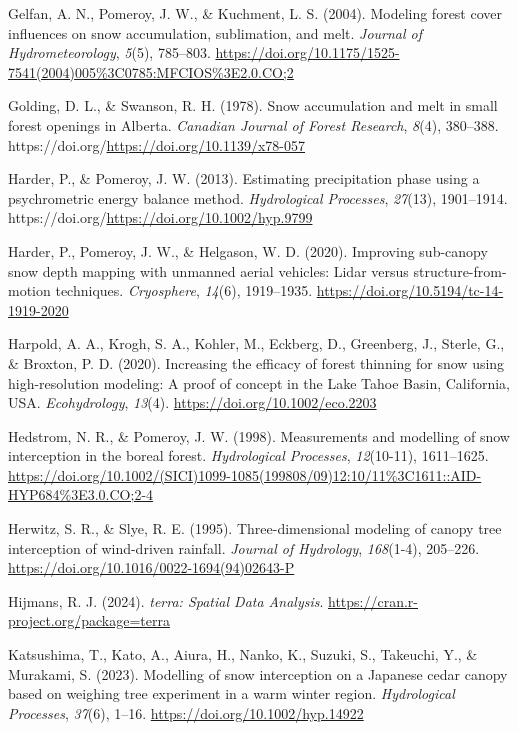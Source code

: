\documentclass[
  letterpaper,
  DIV=11,
  numbers=noendperiod]{scrartcl}
\newlength{\cslhangindent}
\newenvironment{CSLReferences}[2] %
 {\begin{list}{}{%
  \setlength{\itemindent}{0pt}
  \setlength{\leftmargin}{0pt}
  \setlength{\parsep}{0pt}
  \ifodd #1
   \setlength{\leftmargin}{\cslhangindent}
   \setlength{\itemindent}{-1\cslhangindent}
  \fi
  \setlength{\itemsep}{#2\baselineskip}}}
 {\end{list}}
\begin{document}
\begin{CSLReferences}{1}{0}
Gelfan, A. N., Pomeroy, J. W., \& Kuchment, L. S. (2004). {Modeling
forest cover influences on snow accumulation, sublimation, and melt}.
\emph{Journal of Hydrometeorology}, \emph{5}(5), 785--803.
\url{https://doi.org/10.1175/1525-7541(2004)005\%3C0785:MFCIOS\%3E2.0.CO;2}

Golding, D. L., \& Swanson, R. H. (1978). {Snow accumulation and melt in
small forest openings in Alberta}. \emph{Canadian Journal of Forest
Research}, \emph{8}(4), 380--388.
https://doi.org/\url{https://doi.org/10.1139/x78-057}

Harder, P., \& Pomeroy, J. W. (2013). {Estimating precipitation phase
using a psychrometric energy balance method}. \emph{Hydrological
Processes}, \emph{27}(13), 1901--1914.
https://doi.org/\url{https://doi.org/10.1002/hyp.9799}

Harder, P., Pomeroy, J. W., \& Helgason, W. D. (2020). {Improving
sub-canopy snow depth mapping with unmanned aerial vehicles: Lidar
versus structure-from-motion techniques}. \emph{Cryosphere},
\emph{14}(6), 1919--1935. \url{https://doi.org/10.5194/tc-14-1919-2020}

Harpold, A. A., Krogh, S. A., Kohler, M., Eckberg, D., Greenberg, J.,
Sterle, G., \& Broxton, P. D. (2020). {Increasing the efficacy of forest
thinning for snow using high-resolution modeling: A proof of concept in
the Lake Tahoe Basin, California, USA}. \emph{Ecohydrology},
\emph{13}(4). \url{https://doi.org/10.1002/eco.2203}

Hedstrom, N. R., \& Pomeroy, J. W. (1998). {Measurements and modelling
of snow interception in the boreal forest}. \emph{Hydrological
Processes}, \emph{12}(10-11), 1611--1625.
\url{https://doi.org/10.1002/(SICI)1099-1085(199808/09)12:10/11\%3C1611::AID-HYP684\%3E3.0.CO;2-4}

Herwitz, S. R., \& Slye, R. E. (1995). {Three-dimensional modeling of
canopy tree interception of wind-driven rainfall}. \emph{Journal of
Hydrology}, \emph{168}(1-4), 205--226.
\url{https://doi.org/10.1016/0022-1694(94)02643-P}

Hijmans, R. J. (2024). \emph{{terra: Spatial Data Analysis}}.
\url{https://cran.r-project.org/package=terra}

Katsushima, T., Kato, A., Aiura, H., Nanko, K., Suzuki, S., Takeuchi,
Y., \& Murakami, S. (2023). {Modelling of snow interception on a
Japanese cedar canopy based on weighing tree experiment in a warm winter
region}. \emph{Hydrological Processes}, \emph{37}(6), 1--16.
\url{https://doi.org/10.1002/hyp.14922}


\end{CSLReferences}
\end{document}
